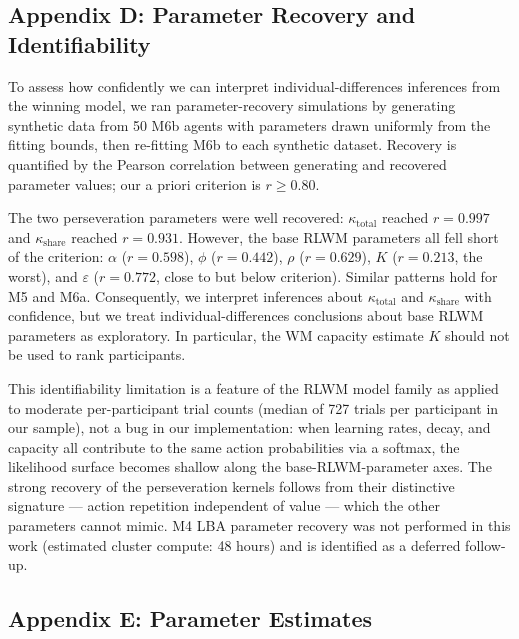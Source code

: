 \documentclass{article}
\begin{document}
\subsection{Appendix D: Parameter Recovery and
Identifiability}\label{sec-parameter-recovery}

To assess how confidently we can interpret individual-differences
inferences from the winning model, we ran parameter-recovery simulations
by generating synthetic data from 50 M6b agents with parameters drawn
uniformly from the fitting bounds, then re-fitting M6b to each synthetic
dataset. Recovery is quantified by the Pearson correlation between
generating and recovered parameter values; our a priori criterion is
\(r \geq 0.80\).

The two perseveration parameters were well recovered:
\(\kappa_{\text{total}}\) reached \(r = 0.997\) and
\(\kappa_{\text{share}}\) reached \(r = 0.931\). However, the base RLWM
parameters all fell short of the criterion: \(\alpha\) (\(r = 0.598\)),
\(\phi\) (\(r = 0.442\)), \(\rho\) (\(r = 0.629\)), \(K\)
(\(r = 0.213\), the worst), and \(\varepsilon\) (\(r = 0.772\), close to
but below criterion). Similar patterns hold for M5 and M6a.
Consequently, we interpret inferences about \(\kappa_{\text{total}}\)
and \(\kappa_{\text{share}}\) with confidence, but we treat
individual-differences conclusions about base RLWM parameters as
exploratory. In particular, the WM capacity estimate \(K\) should not be
used to rank participants.

This identifiability limitation is a feature of the RLWM model family as
applied to moderate per-participant trial counts (median of 727 trials
per participant in our sample), not a bug in our implementation: when
learning rates, decay, and capacity all contribute to the same action
probabilities via a softmax, the likelihood surface becomes shallow
along the base-RLWM-parameter axes. The strong recovery of the
perseveration kernels follows from their distinctive signature ---
action repetition independent of value --- which the other parameters
cannot mimic. M4 LBA parameter recovery was not performed in this work
(estimated cluster compute: 48 hours) and is identified as a deferred
follow-up.

\subsection{Appendix E: Parameter Estimates}\label{sec-param-estimates}
\end{document}
